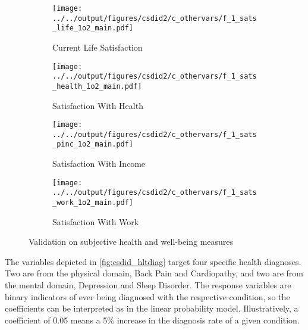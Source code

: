 \begin{figure}[tb!]
    \centering
    \begin{subfigure}{0.475\textwidth}
        \caption{Current Life Satisfaction}
        \texttt{[image: ../../output/figures/csdid2/c\_othervars/f\_1\_sats\_life\_1o2\_main.pdf]}
        \label{fig:csdid_subjective:a}
    \end{subfigure}
    \begin{subfigure}{0.475\textwidth}
        \caption{Satisfaction With Health}
        \texttt{[image: ../../output/figures/csdid2/c\_othervars/f\_1\_sats\_health\_1o2\_main.pdf]}
        \label{fig:csdid_subjective:b}
    \end{subfigure}
    \begin{subfigure}{0.475\textwidth}
        \caption{Satisfaction With Income}
        \texttt{[image: ../../output/figures/csdid2/c\_othervars/f\_1\_sats\_pinc\_1o2\_main.pdf]}
        \label{fig:csdid_subjective:c}
    \end{subfigure}
    \begin{subfigure}{0.475\textwidth}
        \caption{Satisfaction With Work}
        \texttt{[image: ../../output/figures/csdid2/c\_othervars/f\_1\_sats\_work\_1o2\_main.pdf]}
        \label{fig:csdid_subjective:d}
    \end{subfigure}
    \caption{Validation on subjective health and well-being measures} 
    \label{fig:csdid_subjective}
\end{figure}


The variables depicted in \cref{fig:csdid_hltdiag} target four specific health diagnoses. 
Two are from the physical domain, Back Pain and Cardiopathy, and two are from the mental domain, Depression and Sleep Disorder.
The response variables are binary indicators of ever being diagnosed with the respective condition, so the coefficients can be interpreted as in the linear probability model. 
Illustratively, a coefficient of 0.05 means a 5\% increase in the diagnosis rate of a given condition.


